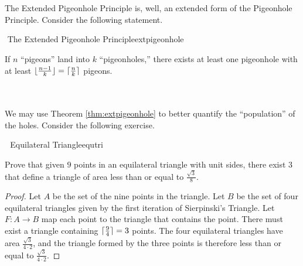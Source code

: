     \vphantom
    \\
    \\
    The Extended Pigeonhole Principle is, well, an extended form of the Pigeonhole Principle. Consider the following statement.
    \begin{theorem}{\Stop\,\,The Extended Pigeonhole Principle}{extpigeonhole}
    
        If \(n\) ``pigeons'' land into \(k\) ``pigeonholes,'' there exists at least one pigeonhole with at least \(\lfloor\frac{n-1}{k}\rfloor=\lceil\frac{n}{k}\rceil\) pigeons.
    
    \end{theorem}
    \vphantom
    \\
    \\
    We may use Theorem \ref{thm:extpigeonhole} to better quantify the ``population'' of the holes. Consider the following exercise.
    \begin{exercise}{\Difficulty\,\Difficulty\,\Difficulty\,\,Equilateral Triangle}{equtri}
    
        Prove that given \(9\) points in an equilateral triangle with unit sides, there exist \(3\) that define a triangle of area less than or equal to \(\frac{\sqrt{3}}{8}\).
        \begin{proof}
            Let \(A\) be the set of the nine points in the triangle. Let \(B\) be the set of four equilateral triangles given by the first iteration of Sierpinski's Triangle. Let \(F:A\to B\) map each point to the triangle that contains the point. There must exist a triangle containing \(\lceil\frac{9}{4}\rceil=3\) points. The four equilateral triangles have area \(\frac{\sqrt{3}}{4\cdot2}\), and the triangle formed by the three points is therefore less than or equal to \(\frac{\sqrt{3}}{4\cdot2}\).
        \end{proof}
    
    \end{exercise}